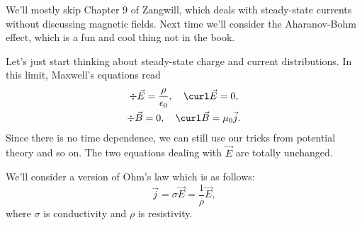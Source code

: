 We'll mostly skip Chapter 9 of Zangwill, which deals with steady-state currents without discussing magnetic fields. Next time we'll consider the Aharanov-Bohm effect, which is a fun and cool thing not in the book.

Let's just start thinking about steady-state charge and current distributions. In this limit, Maxwell's equations read
\begin{gather}
    \div \vec E = \frac{\rho}{\epsilon_0}, \quad \curl \vec E = 0,\\
    \div \vec B = 0, \quad \curl \vec B = \mu_0 \vec j.
\end{gather}
Since there is no time dependence, we can still use our tricks from potential theory and so on. The two equations dealing with $\vec E$ are totally unchanged.

We'll consider a version of Ohm's law which is as follows:
\begin{equation}
    \vec j = \sigma \vec E = \frac{1}{\rho} \vec E,
\end{equation}
where $\sigma$ is conductivity and $\rho$ is resistivity.